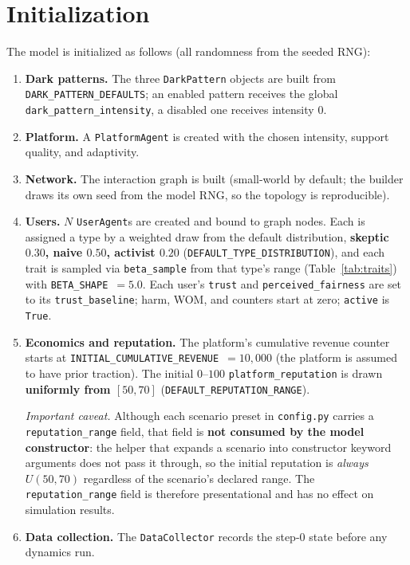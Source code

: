 \documentclass[11pt]{article}
\newcommand{\code}[1]{\texttt{#1}}
\begin{document}
\section{Initialization}
\label{sec:init}

The model is initialized as follows (all randomness from the seeded RNG):

\begin{enumerate}
  \item \textbf{Dark patterns.} The three \code{DarkPattern} objects are built
  from \code{DARK\_PATTERN\_DEFAULTS}; an enabled pattern receives the global
  \code{dark\_pattern\_intensity}, a disabled one receives intensity $0$.
  \item \textbf{Platform.} A \code{PlatformAgent} is created with the chosen
  intensity, support quality, and adaptivity.
  \item \textbf{Network.} The interaction graph is built (small-world by default;
  the builder draws its own seed from the model RNG, so the topology is
  reproducible).
  \item \textbf{Users.} $N$ \code{UserAgent}s are created and bound to graph
  nodes. Each is assigned a type by a weighted draw from the default
  distribution, \textbf{skeptic $0.30$, naive $0.50$, activist $0.20$}
  (\code{DEFAULT\_TYPE\_DISTRIBUTION}), and each trait is sampled via
  \code{beta\_sample} from that type's range (Table~\ref{tab:traits}) with
  \code{BETA\_SHAPE}~$=5.0$. Each user's \code{trust} and
  \code{perceived\_fairness} are set to its \code{trust\_baseline}; harm, WOM,
  and counters start at zero; \code{active} is \code{True}.
  \item \textbf{Economics and reputation.} The platform's cumulative revenue
  counter starts at \code{INITIAL\_CUMULATIVE\_REVENUE}~$=10{,}000$ (the
  platform is assumed to have prior traction). The initial $0$--$100$ \code{platform\_reputation} is
  drawn \textbf{uniformly from $[50, 70]$} (\code{DEFAULT\_REPUTATION\_RANGE}).

  \emph{Important caveat.} Although each scenario preset in
  \code{config.py} carries a \code{reputation\_range} field, that field is
  \textbf{not consumed by the model constructor}: the helper that expands a
  scenario into constructor keyword arguments does not pass it through, so the
  initial reputation is \emph{always} $U(50,70)$ regardless of the scenario's
  declared range. The \code{reputation\_range} field is therefore presentational
  and has no effect on simulation results.
  \item \textbf{Data collection.} The \code{DataCollector} records the step-0
  state before any dynamics run.
\end{enumerate}
\end{document}

